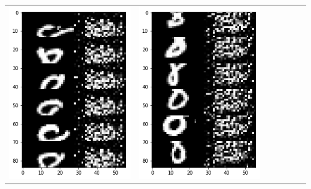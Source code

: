 \documentclass[12pt]{report} %
\begin{document}
\begin{tabular}{m{0.7cm}m{2.4cm}m{2.4cm}m{2.4cm}m{2.4cm}m{2.4cm}m{2.4cm}}
\includegraphics[scale=0.3]{pictures/M2_8_up.png} & \includegraphics[scale=0.3]{pictures/M2_8_down.png}\\

\end{tabular}
\end{document}
